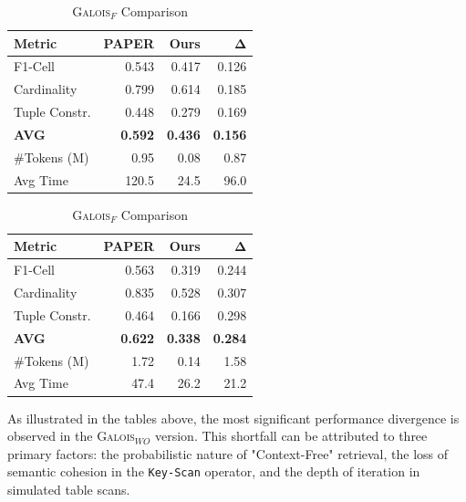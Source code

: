 \begin{table}[H]
    \vspace{0.5cm} %

    \begin{minipage}[t]{0.48\textwidth}
        \centering
        \caption{\textsc{Galois}$_{A}$ Comparison}
        \label{tab:galoisA_results}
        \begin{tabular}{lrrr}
            \toprule
            \textbf{Metric} & \textbf{PAPER} & \textbf{Ours} & $\mathbf{\Delta}$ \\
            \midrule
            F1-Cell & 0.543 & 0.417 & 0.126 \\
            Cardinality & 0.799 & 0.614 & 0.185 \\
            Tuple Constr. & 0.448 & 0.279 & 0.169 \\
            \textbf{AVG} & \textbf{0.592} & \textbf{0.436} & \textbf{0.156} \\
            \#Tokens (M) & 0.95 & 0.08 & 0.87 \\
            Avg Time & 120.5 & 24.5 & 96.0 \\
            \bottomrule
        \end{tabular}
    \end{minipage}
    \hfill
    \begin{minipage}[t]{0.48\textwidth}
        \centering
        \caption{\textsc{Galois}$_{F}$ Comparison}
        \label{tab:galoisF_results}
        \begin{tabular}{lrrr}
            \toprule
            \textbf{Metric} & \textbf{PAPER} & \textbf{Ours} & $\mathbf{\Delta}$ \\
            \midrule
            F1-Cell & 0.563 & 0.319 & 0.244 \\
            Cardinality & 0.835 & 0.528 & 0.307 \\
            Tuple Constr. & 0.464 & 0.166 & 0.298 \\
            \textbf{AVG} & \textbf{0.622} & \textbf{0.338} & \textbf{0.284} \\
            \#Tokens (M) & 1.72 & 0.14 & 1.58 \\
            Avg Time & 47.4 & 26.2 & 21.2 \\
            \bottomrule
        \end{tabular}
    \end{minipage}
\end{table}
As illustrated in the tables above, the most significant performance divergence is observed in the \textsc{Galois}$_{WO}$ version. This shortfall can be attributed to three primary factors: the probabilistic nature of "Context-Free" retrieval, the loss of semantic cohesion in the \texttt{Key-Scan} operator, and the depth of iteration in simulated table scans.

